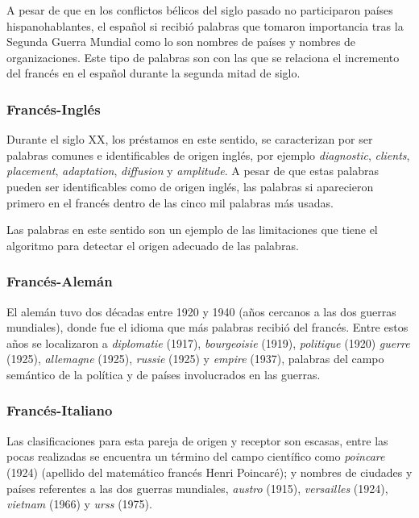 A pesar de que en los conflictos bélicos del siglo pasado no participaron países hispanohablantes, el español si recibió palabras que tomaron importancia tras la Segunda Guerra Mundial como lo son nombres de países y nombres de organizaciones. Este tipo de palabras son con las que se relaciona el incremento del francés en el español durante la segunda mitad de siglo. 



\subsubsection*{Francés-Inglés}%

Durante el siglo XX, los préstamos en este sentido, se caracterizan por ser palabras comunes e identificables de origen inglés,  por ejemplo  \textit{diagnostic}, \textit{clients}, \textit{placement}, \textit{adaptation}, \textit{diffusion} y \textit{amplitude}.  A pesar de
que estas palabras pueden ser identificables como de origen inglés, las palabras si aparecieron primero en el francés dentro de las cinco mil palabras más usadas. 

Las palabras en este sentido son un ejemplo de las limitaciones que tiene el algoritmo para detectar el origen adecuado de las palabras. 

\subsubsection*{Francés-Alemán}%

El alemán tuvo dos décadas entre 1920 y 1940  (años cercanos a las dos guerras mundiales), donde  fue el idioma que más palabras recibió del francés. Entre estos años se localizaron a \textit{diplomatie} (1917), \textit{bourgeoisie} (1919), \textit{politique} (1920)  \textit{guerre} (1925), \textit{allemagne} (1925), \textit{russie} (1925) y \textit{empire} (1937), palabras del campo semántico de la política y de países involucrados en las guerras. 



\subsubsection*{Francés-Italiano}%

Las clasificaciones para esta pareja de origen y receptor son escasas, entre las pocas realizadas se encuentra un término del campo científico como \textit{poincare} (1924) (apellido del matemático francés Henri Poincaré);  y nombres de ciudades y países referentes a las dos guerras mundiales, \textit{austro} (1915), \textit{versailles} (1924), \textit{vietnam} (1966)  y \textit{urss} (1975).


